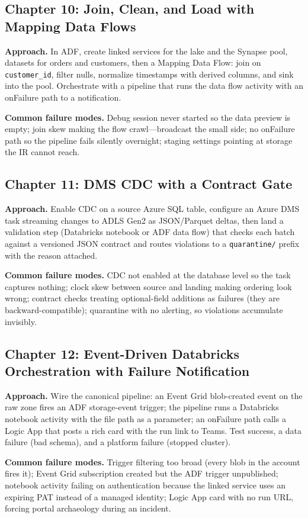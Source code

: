 \subsection*{Chapter 10: Join, Clean, and Load with Mapping Data Flows}
\textbf{Approach.} In ADF, create linked services for the lake and the Synapse pool, datasets for
orders and customers, then a Mapping Data Flow: join on \texttt{customer\_id}, filter nulls,
normalize timestamps with derived columns, and sink into the pool. Orchestrate with a pipeline
that runs the data flow activity with an onFailure path to a notification.

\textbf{Common failure modes.} Debug session never started so the data preview is empty; join
skew making the flow crawl---broadcast the small side; no onFailure path so the pipeline fails
silently overnight; staging settings pointing at storage the IR cannot reach.

\subsection*{Chapter 11: DMS CDC with a Contract Gate}
\textbf{Approach.} Enable CDC on a source Azure SQL table, configure an Azure DMS task streaming
changes to ADLS Gen2 as JSON/Parquet deltas, then land a validation step (Databricks notebook or
ADF data flow) that checks each batch against a versioned JSON contract and routes violations to
a \texttt{quarantine/} prefix with the reason attached.

\textbf{Common failure modes.} CDC not enabled at the database level so the task captures nothing;
clock skew between source and landing making ordering look wrong; contract checks treating
optional-field additions as failures (they are backward-compatible); quarantine with no alerting,
so violations accumulate invisibly.

\subsection*{Chapter 12: Event-Driven Databricks Orchestration with Failure Notification}
\textbf{Approach.} Wire the canonical pipeline: an Event Grid blob-created event on the raw zone
fires an ADF storage-event trigger; the pipeline runs a Databricks notebook activity with the
file path as a parameter; an onFailure path calls a Logic App that posts a rich card with the run
link to Teams. Test success, a data failure (bad schema), and a platform failure (stopped
cluster).

\textbf{Common failure modes.} Trigger filtering too broad (every blob in the account fires it);
Event Grid subscription created but the ADF trigger unpublished; notebook activity failing on
authentication because the linked service uses an expiring PAT instead of a managed identity;
Logic App card with no run URL, forcing portal archaeology during an incident.

